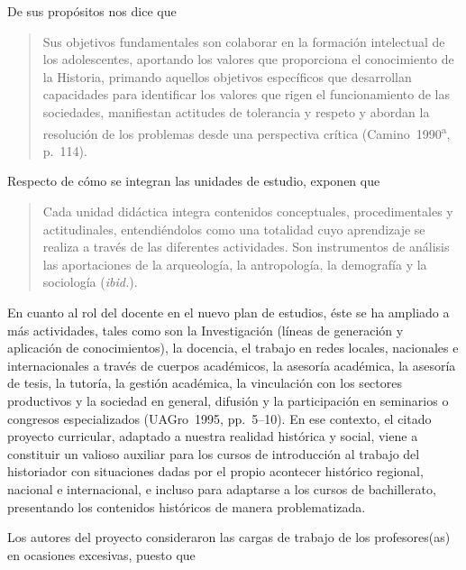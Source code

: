  
De sus propósitos nos dice que 

\begin{quotation}
Sus objetivos fundamentales son 
colaborar en la formación intelectual de los adolescentes, aportando 
los valores que proporciona el conocimiento de la Historia, primando 
aquellos objetivos específicos que desarrollan capacidades para 
identificar los valores que rigen el funcionamiento de las sociedades, 
manifiestan actitudes de tolerancia y respeto y abordan la resolución 
de los problemas desde una perspectiva crítica (Camino~1990\textsuperscript{a}, p.~114).
\end{quotation} 
 
Respecto de cómo se integran las unidades de estudio, exponen que 

\begin{quotation}
\begin{sloppypar}
Cada unidad didáctica integra contenidos con\-cep\-tua\-les, 
pro\-ce\-di\-men\-ta\-les y actitudinales, entendiéndolos como una 
totalidad cuyo aprendizaje se realiza a través de las diferentes 
actividades. Son instrumentos de análisis las aportaciones de la 
arqueología, la antropología, la demografía y la 
sociología ({\itshape ibid.}).
\end{sloppypar}
\end{quotation}

\enlargethispage{1\baselineskip} 
En cuanto al rol del docente en el nuevo plan de estudios, éste se ha 
ampliado a más actividades, tales como son la Investigación (líneas de 
generación y aplicación de conocimientos), la docencia, el trabajo en redes 
locales, nacionales e internacionales a través de cuerpos académicos, 
la asesoría académica, la asesoría de tesis, la tutoría, la gestión académica, 
la vinculación con los sectores productivos y la sociedad en general, 
difusión y la participación en seminarios o congresos 
especializados (UAGro~1995, pp.~5--10). En ese contexto, el citado 
proyecto curricular, adaptado a nuestra realidad histórica y social, 
viene a constituir un valioso auxiliar para los cursos de introducción 
al trabajo del historiador con situaciones dadas por el propio 
acontecer histórico regional, nacional e internacional, e incluso para 
adaptarse a los cursos de bachillerato, presentando los contenidos 
históricos de manera problematizada. 

 
Los autores del proyecto consideraron las cargas de trabajo de los 
profesores(as) en ocasiones excesivas, puesto que 

